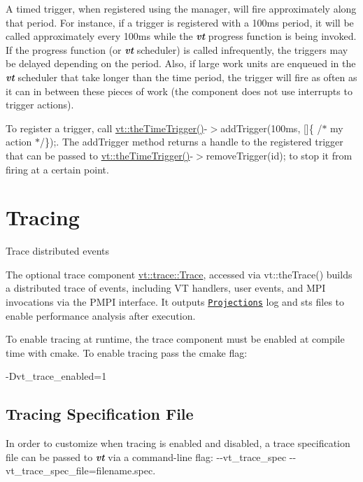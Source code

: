 A timed trigger, when registered using the manager, will fire approximately along that period. For instance, if a trigger is registered with a 100ms period, it will be called approximately every 100ms while the {\bfseries {\itshape vt}} progress function is being invoked. If the progress function (or {\bfseries {\itshape vt}} scheduler) is called infrequently, the triggers may be delayed depending on the period. Also, if large work units are enqueued in the {\bfseries {\itshape vt}} scheduler that take longer than the time period, the trigger will fire as often as it can in between these pieces of work (the component does not use interrupts to trigger actions).

To register a trigger, call {\ttfamily \hyperlink{namespacevt_a1e1a39cdf2a3fc1adefcdfcca4716bf2}{vt\+::the\+Time\+Trigger()}-\/$>$add\+Trigger(100ms, \mbox{[}\mbox{]}\{ /$\ast$ my action $\ast$/\});}. The {\ttfamily add\+Trigger} method returns a handle to the registered trigger that can be passed to {\ttfamily \hyperlink{namespacevt_a1e1a39cdf2a3fc1adefcdfcca4716bf2}{vt\+::the\+Time\+Trigger()}-\/$>$remove\+Trigger(id);} to stop it from firing at a certain point. \hypertarget{trace}{}\section{Tracing}\label{trace}
Trace distributed events

The optional trace component {\ttfamily \hyperlink{structvt_1_1trace_1_1_trace}{vt\+::trace\+::\+Trace}}, accessed via {\ttfamily vt\+::the\+Trace()} builds a distributed trace of events, including VT handlers, user events, and M\+PI invocations via the P\+M\+PI interface. It outputs \href{http://charm.cs.uiuc.edu/software}{\tt Projections} log and sts files to enable performance analysis after execution.

To enable tracing at runtime, the trace component must be enabled at compile time with cmake. To enable tracing pass the cmake flag\+: 
\begin{DoxyCode}
-Dvt\_trace\_enabled=1
\end{DoxyCode}
\hypertarget{trace_tracing-spec-file}{}\subsection{Tracing Specification File}\label{trace_tracing-spec-file}
In order to customize when tracing is enabled and disabled, a trace specification file can be passed to {\bfseries {\itshape vt}} via a command-\/line flag\+: {\ttfamily -\/-\/vt\+\_\+trace\+\_\+spec -\/-\/vt\+\_\+trace\+\_\+spec\+\_\+file=filename.\+spec}.

